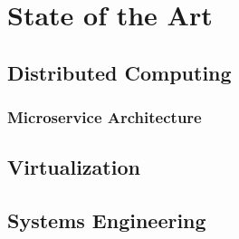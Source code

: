 \chapter{State of the Art}
\label{sec:state-of-the-art}
\section{Distributed Computing}
\subsection{Microservice Architecture}

\section{Virtualization}

\section{Systems Engineering}
